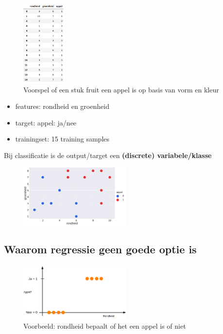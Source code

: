 \documentclass{article}
\begin{document}
\begin{figure}[H]
    \centering
    \includegraphics[width=0.2\textwidth]{multilabel-classifier2.png}
    \caption{Voorspel of een stuk fruit een appel is op basis van vorm en kleur}
\end{figure}

\begin{itemize}
    \item features: rondheid en groenheid
    \item target: appel: ja/nee
    \item trainingset: 15 training samples
\end{itemize}

Bij classificatie is de output/target een \textbf{(discrete) variabele/klasse}

\begin{figure}[H]
    \centering
    \includegraphics[width=0.5\textwidth]{multilabel-classifier3.png}
    \caption{}
\end{figure}

\subsection{Waarom regressie geen goede optie is}

\begin{figure}[H]
    \centering
    \includegraphics[width=0.5\textwidth]{classificatie-regressie.png}
    \caption{Voorbeeld: rondheid bepaalt of het een appel is of niet}
\end{figure}
\end{document}
